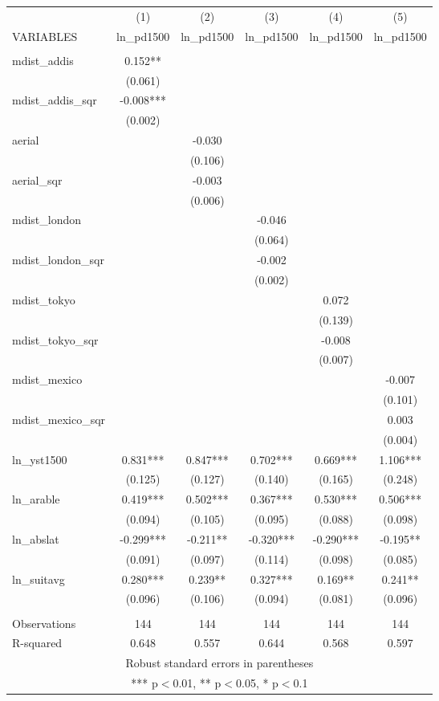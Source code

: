 \documentclass[]{article}
\begin{document}
\begin{tabular}{lccccc} \hline
 & (1) & (2) & (3) & (4) & (5) \\
VARIABLES & ln\_pd1500 & ln\_pd1500 & ln\_pd1500 & ln\_pd1500 & ln\_pd1500 \\ \hline
 &  &  &  &  &  \\
mdist\_addis & 0.152** &  &  &  &  \\
 & (0.061) &  &  &  &  \\
mdist\_addis\_sqr & -0.008*** &  &  &  &  \\
 & (0.002) &  &  &  &  \\
aerial &  & -0.030 &  &  &  \\
 &  & (0.106) &  &  &  \\
aerial\_sqr &  & -0.003 &  &  &  \\
 &  & (0.006) &  &  &  \\
mdist\_london &  &  & -0.046 &  &  \\
 &  &  & (0.064) &  &  \\
mdist\_london\_sqr &  &  & -0.002 &  &  \\
 &  &  & (0.002) &  &  \\
mdist\_tokyo &  &  &  & 0.072 &  \\
 &  &  &  & (0.139) &  \\
mdist\_tokyo\_sqr &  &  &  & -0.008 &  \\
 &  &  &  & (0.007) &  \\
mdist\_mexico &  &  &  &  & -0.007 \\
 &  &  &  &  & (0.101) \\
mdist\_mexico\_sqr &  &  &  &  & 0.003 \\
 &  &  &  &  & (0.004) \\
ln\_yst1500 & 0.831*** & 0.847*** & 0.702*** & 0.669*** & 1.106*** \\
 & (0.125) & (0.127) & (0.140) & (0.165) & (0.248) \\
ln\_arable & 0.419*** & 0.502*** & 0.367*** & 0.530*** & 0.506*** \\
 & (0.094) & (0.105) & (0.095) & (0.088) & (0.098) \\
ln\_abslat & -0.299*** & -0.211** & -0.320*** & -0.290*** & -0.195** \\
 & (0.091) & (0.097) & (0.114) & (0.098) & (0.085) \\
ln\_suitavg & 0.280*** & 0.239** & 0.327*** & 0.169** & 0.241** \\
 & (0.096) & (0.106) & (0.094) & (0.081) & (0.096) \\
 &  &  &  &  &  \\
Observations & 144 & 144 & 144 & 144 & 144 \\
 R-squared & 0.648 & 0.557 & 0.644 & 0.568 & 0.597 \\ \hline
\multicolumn{6}{c}{ Robust standard errors in parentheses} \\
\multicolumn{6}{c}{ *** p$<$0.01, ** p$<$0.05, * p$<$0.1} \\
\end{tabular}
\end{document}
